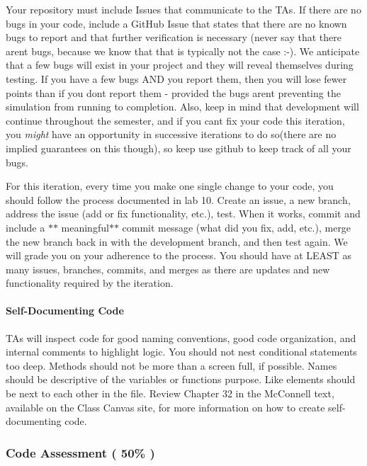 Your repository must include Issues that communicate to the T\+As. If there are no bugs in your code, include a Git\+Hub Issue that states that there are no known bugs to report and that further verification is necessary (never say that there aren\textquotesingle{}t bugs, because we know that that is typically not the case \+:-\/). We anticipate that a few bugs will exist in your project and they will reveal themselves during testing. If you have a few bugs A\+ND you report them, then you will lose fewer points than if you don\textquotesingle{}t report them -\/ provided the bugs aren\textquotesingle{}t preventing the simulation from running to completion. Also, keep in mind that development will continue throughout the semester, and if you can\textquotesingle{}t fix your code this iteration, you {\itshape might} have an opportunity in successive iterations to do so(there are no implied guarantees on this though), so keep use github to keep track of all your bugs.

For this iteration, every time you make one single change to your code, you should follow the process documented in lab 10. Create an issue, a new branch, address the issue (add or fix functionality, etc.), test. When it works, commit and include a $\ast$$\ast$ meaningful$\ast$$\ast$ commit message (what did you fix, add, etc.), merge the new branch back in with the development branch, and then test again. We will grade you on your adherence to the process. You should have at L\+E\+A\+ST as many issues, branches, commits, and merges as there are updates and new functionality required by the iteration.

\paragraph*{Self-\/\+Documenting Code}

T\+As will inspect code for good naming conventions, good code organization, and internal comments to highlight logic. You should not nest conditional statements too deep. Methods should not be more than a screen full, if possible. Names should be descriptive of the variable\textquotesingle{}s or function\textquotesingle{}s purpose. Like elements should be next to each other in the file. Review Chapter 32 in the Mc\+Connell text, available on the Class Canvas site, for more information on how to create self-\/documenting code.

\subsubsection*{Code Assessment ( 50\% )}

